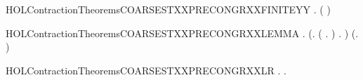 \newcommand{\HOLContractionTheoremsCOARSESTXXPRECONGRXXFINITE}{\UseVerbatim{HOLContractionTheoremsCOARSESTXXPRECONGRXXFINITE}}
\begin{SaveVerbatim}{HOLContractionTheoremsCOARSESTXXPRECONGRXXFINITEYY}
\HOLTokenTurnstile{} \HOLSymConst{\HOLTokenForall{}} .
         \HOLSymConst{\HOLTokenConj{}}   \HOLSymConst{\HOLTokenImp{}}
       (   \HOLSymConst{\HOLTokenEquiv{}}   )
\end{SaveVerbatim}
\newcommand{\HOLContractionTheoremsCOARSESTXXPRECONGRXXFINITEYY}{\UseVerbatim{HOLContractionTheoremsCOARSESTXXPRECONGRXXFINITEYY}}
\begin{SaveVerbatim}{HOLContractionTheoremsCOARSESTXXPRECONGRXXLEMMA}
\HOLTokenTurnstile{} \HOLSymConst{\HOLTokenForall{}} .
       (\HOLSymConst{\HOLTokenExists{}}.
              \HOLSymConst{\HOLTokenConj{}} (\HOLSymConst{\HOLTokenForall{}} .  \HOLTokenWeakTransBegin{}\HOLTokenWeakTransEnd {} \HOLSymConst{\HOLTokenImp{}} \HOLSymConst{\HOLTokenNeg{}}  ) \HOLSymConst{\HOLTokenConj{}}
            \HOLSymConst{\HOLTokenForall{}} .  \HOLTokenWeakTransBegin{}\HOLTokenWeakTransEnd {} \HOLSymConst{\HOLTokenImp{}} \HOLSymConst{\HOLTokenNeg{}}  ) \HOLSymConst{\HOLTokenImp{}}
       (\HOLSymConst{\HOLTokenForall{}}.  \HOLSymConst{+}    \HOLSymConst{+} ) \HOLSymConst{\HOLTokenImp{}}
         
\end{SaveVerbatim}
\newcommand{\HOLContractionTheoremsCOARSESTXXPRECONGRXXLEMMA}{\UseVerbatim{HOLContractionTheoremsCOARSESTXXPRECONGRXXLEMMA}}
\begin{SaveVerbatim}{HOLContractionTheoremsCOARSESTXXPRECONGRXXLR}
\HOLTokenTurnstile{} \HOLSymConst{\HOLTokenForall{}} .    \HOLSymConst{\HOLTokenImp{}} \HOLSymConst{\HOLTokenForall{}}.  \HOLSymConst{+}    \HOLSymConst{+} 
\end{SaveVerbatim}
